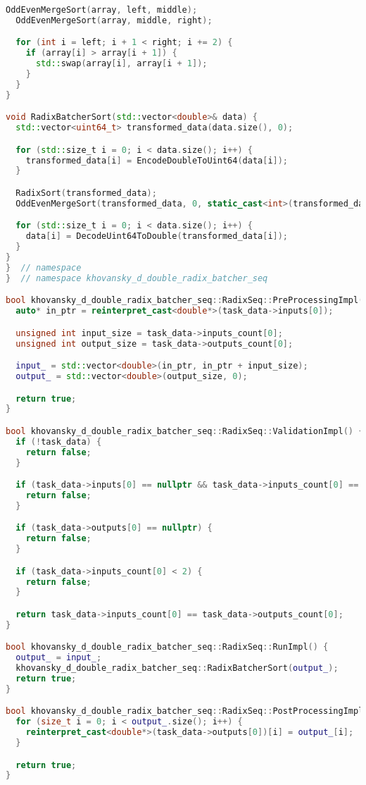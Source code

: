 \documentclass[12pt]{article}
\begin{document}
\begin{lstlisting}[language=C++,
    breaklines=true,       % Автоматический перенос строк
    columns=fullflexible ]
  OddEvenMergeSort(array, left, middle);
  OddEvenMergeSort(array, middle, right);

  for (int i = left; i + 1 < right; i += 2) {
    if (array[i] > array[i + 1]) {
      std::swap(array[i], array[i + 1]);
    }
  }
}

void RadixBatcherSort(std::vector<double>& data) {
  std::vector<uint64_t> transformed_data(data.size(), 0);

  for (std::size_t i = 0; i < data.size(); i++) {
    transformed_data[i] = EncodeDoubleToUint64(data[i]);
  }

  RadixSort(transformed_data);
  OddEvenMergeSort(transformed_data, 0, static_cast<int>(transformed_data.size()));

  for (std::size_t i = 0; i < data.size(); i++) {
    data[i] = DecodeUint64ToDouble(transformed_data[i]);
  }
}
}  // namespace
}  // namespace khovansky_d_double_radix_batcher_seq

bool khovansky_d_double_radix_batcher_seq::RadixSeq::PreProcessingImpl() {
  auto* in_ptr = reinterpret_cast<double*>(task_data->inputs[0]);

  unsigned int input_size = task_data->inputs_count[0];
  unsigned int output_size = task_data->outputs_count[0];

  input_ = std::vector<double>(in_ptr, in_ptr + input_size);
  output_ = std::vector<double>(output_size, 0);

  return true;
}

bool khovansky_d_double_radix_batcher_seq::RadixSeq::ValidationImpl() {
  if (!task_data) {
    return false;
  }

  if (task_data->inputs[0] == nullptr && task_data->inputs_count[0] == 0) {
    return false;
  }

  if (task_data->outputs[0] == nullptr) {
    return false;
  }

  if (task_data->inputs_count[0] < 2) {
    return false;
  }

  return task_data->inputs_count[0] == task_data->outputs_count[0];
}

bool khovansky_d_double_radix_batcher_seq::RadixSeq::RunImpl() {
  output_ = input_;
  khovansky_d_double_radix_batcher_seq::RadixBatcherSort(output_);
  return true;
}

bool khovansky_d_double_radix_batcher_seq::RadixSeq::PostProcessingImpl() {
  for (size_t i = 0; i < output_.size(); i++) {
    reinterpret_cast<double*>(task_data->outputs[0])[i] = output_[i];
  }

  return true;
}
\end{lstlisting}
\end{document}
